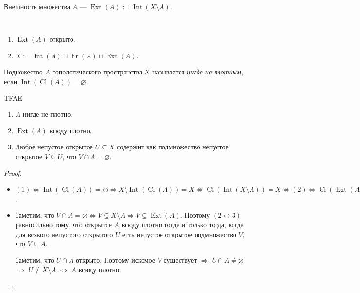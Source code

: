 \documentclass[12pt,a4paper]{article}
\DeclareMathOperator{\Int}{Int}
\DeclareMathOperator{\Ext}{Ext}
\DeclareMathOperator{\Cl}{Cl}
\DeclareMathOperator{\Fr}{Fr}
\begin{document}
    \begin{definition}
        Внешность множества $A$ --- $\Ext(A) := \Int(X \setminus A)$.
    \end{definition}

    \begin{lemma}\ 
        \begin{enumerate}
            \item $\Ext(A)$ открыто.
            \item $X := \Int(A) \sqcup \Fr(A) \sqcup \Ext(A)$.
        \end{enumerate}
    \end{lemma}

    \begin{definition}
        Подножество $A$ топологического пространства $X$ называется \emph{нигде не плотным}, если $\Int(\Cl(A)) = \varnothing$.
    \end{definition}

    \begin{lemma}
        TFAE
        \begin{enumerate}
            \item $A$ нигде не плотно.
            \item $\Ext(A)$ всюду плотно.
            \item Любое непустое открытое $U \subseteq X$ содержит как подмножество непустое открытое $V \subseteq U$, что $V \cap A = \varnothing$.
        \end{enumerate}
    \end{lemma}

    \begin{proof}
        \begin{itemize}
            \item $(1) \Leftrightarrow \Int(\Cl(A)) = \varnothing \Leftrightarrow X \setminus \Int(\Cl(A)) = X \Leftrightarrow \Cl(\Int(X \setminus A)) = X \Leftrightarrow (2) \Leftrightarrow \Cl(\Ext(A)) = X$.
            \item Заметим, что $V \cap A = \varnothing \Leftrightarrow V \subseteq X \setminus A \Leftrightarrow V \subseteq \Ext(A)$. Поэтому $(2 \leftrightarrow 3)$ равносильно тому, что открытое $A$ всюду плотно тогда и только тогда, когда для всякого непустого открытого $U$ есть непустое открытое подмножество $V$, что $V \subseteq A$.

            Заметим, что $U \cap A$ открыто. Поэтому искомое $V$ существует $\Leftrightarrow$ $U \cap A \neq \varnothing$ $\Leftrightarrow$ $U \nsubseteq X \setminus A$ $\Leftrightarrow$ $A$ всюду плотно.
        \end{itemize}
    \end{proof}
\end{document}

